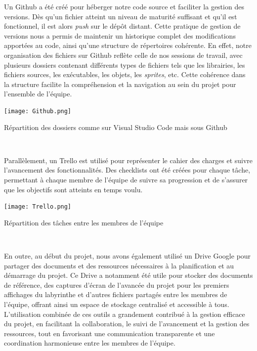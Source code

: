 \documentclass[10pt]{article}
\begin{document}
Un \gls{Github} a été créé pour héberger notre code source et faciliter la gestion des versions. Dès qu'un fichier atteint un niveau de maturité suffisant et qu'il est fonctionnel, il est alors \textit{\gls{push}} sur le dépôt distant. Cette pratique de gestion de versions nous a permis de maintenir un historique complet des modifications apportées au code, ainsi qu'une structure de répertoires cohérente. En effet, notre organisation des fichiers sur \gls{Github} reflète celle de nos sessions de travail, avec plusieurs dossiers contenant différents types de fichiers tels que les librairies, les fichiers sources, les exécutables, les objets, les \textit{\gls{sprites}}, etc. Cette cohérence dans la structure facilite la compréhension et la navigation au sein du projet pour l'ensemble de l'équipe.
\\
\begin{center}
\centering
\texttt{[image: Github.png]}
\caption{Répartition des dossiers comme sur Visual Studio Code mais sous Github}
\label{fig4}\\
\end{center}
Parallèlement, un \gls{Trello} est utilisé pour représenter le cahier des charges et suivre l'avancement des fonctionnalités. Des checklists ont été créées pour chaque tâche, permettant à chaque membre de l'équipe de suivre sa progression et de s'assurer que les objectifs sont atteints en temps voulu.\\
\begin{center}
\centering
\texttt{[image: Trello.png]}
\caption{Répartition des tâches entre les membres de l'équipe}
\label{fig4}\\
\end{center}
En outre, au début du projet, nous avons également utilisé un Drive Google pour partager des documents et des ressources nécessaires à la planification et au démarrage du projet. Ce Drive a notamment été utile pour stocker des documents de référence, des captures d'écran de l'avancée du projet pour les premiers affichages du labyrinthe et d'autres fichiers partagés entre les membres de l'équipe, offrant ainsi un espace de stockage centralisé et accessible à tous.\\

L'utilisation combinée de ces outils a grandement contribué à la gestion efficace du projet, en facilitant la collaboration, le suivi de l'avancement et la gestion des ressources, tout en favorisant une communication transparente et une coordination harmonieuse entre les membres de l'équipe.
\end{document}
